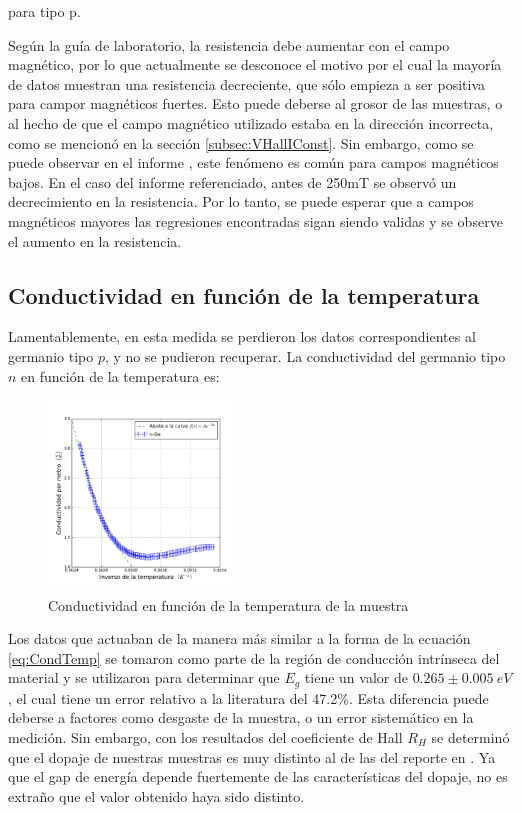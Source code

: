\documentclass[twocolumn,showkeys,preprintnumbers,amsmath,amssymb]{revtex4}
\begin{document}
		para tipo p.
		
		Según la guía de laboratorio, la resistencia debe aumentar con el campo magnético, por lo que actualmente se desconoce el motivo por el cual la mayoría de datos muestran una resistencia decreciente, que sólo empieza a ser positiva para campor magnéticos fuertes. Esto puede deberse al grosor de las muestras, o al hecho de que el campo magnético utilizado estaba en la dirección incorrecta, como se mencionó en la sección \ref{subsec:VHallIConst}. Sin embargo, como se puede observar en el informe \cite{bib:Purwar}, este fenómeno es común para campos magnéticos bajos. En el caso del informe referenciado, antes de 250mT se observó un decrecimiento en la resistencia. Por lo tanto, se puede esperar que a campos magnéticos mayores las regresiones encontradas sigan siendo validas y se observe el aumento en la resistencia. 
		
	\subsection{Conductividad en función de la temperatura}
	
		Lamentablemente, en esta medida se perdieron los datos correspondientes al germanio tipo $p$, y no se pudieron recuperar. La conductividad del germanio tipo $n$ en función de la temperatura es:
		
		\begin{figure}[H]
			\centering
			\includegraphics[width=0.45\textwidth]{ConductividadTemp.pdf}
			\caption{Conductividad en función de la temperatura de la muestra}
			\label{fig:CTemp}
		\end{figure}
		
		Los datos que actuaban de la manera más similar a la forma de la ecuación \eqref{eq:CondTemp} se tomaron como parte de la región de conducción intrínseca del material y se utilizaron para determinar que $E_g$ tiene un valor de $0.265\pm 0.005 \ eV$, el cual tiene un error relativo a la literatura\cite{bib:soporteN} del 47.2\%. Esta diferencia puede deberse a factores como desgaste de la muestra, o un error sistemático en la medición. Sin embargo, con los resultados del coeficiente de Hall $R_H$ se determinó que el dopaje de nuestras muestras es muy distinto al de las del reporte en \cite{bib:soporteN}. Ya que el gap de energía depende fuertemente de las características del dopaje, no es extraño que el valor obtenido haya sido distinto.
		
\end{document}

